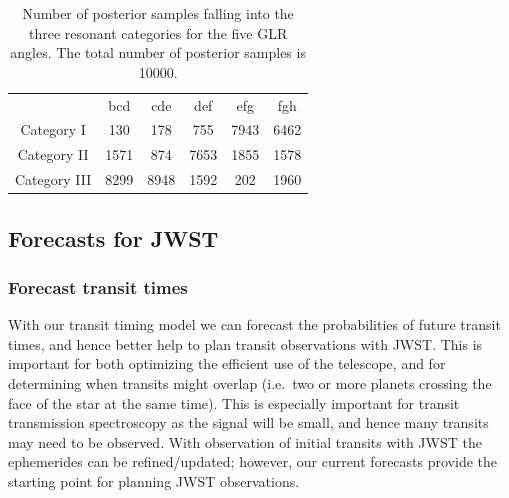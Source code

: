 \documentclass[twocolumn]{aastex63}
\begin{document}
\begin{table}
    \centering
    \begin{tabular}{|c|c c c c c}
                     & bcd  & cde  & def  & efg  & fgh  \\
        Category I   & 130  & 178  & 755  & 7943 & 6462 \\
        Category II  & 1571 & 874  & 7653 & 1855 & 1578 \\
        Category III & 8299 & 8948 & 1592 & 202  & 1960
    \end{tabular}
    \caption{Number of posterior samples falling into the three resonant categories for the five GLR angles. The total number of posterior samples is 10000.}
    \label{tab:cat}
\end{table}




\subsection{Forecasts for JWST}

%


\subsubsection{Forecast transit times}

With our transit timing model we can forecast the probabilities of future transit times,
and hence better help to plan transit observations with JWST.  This is
important for both optimizing the efficient use of the telescope, and for
determining when transits might overlap (i.e.\ two or more planets crossing the face
of the star at the same time).  This is especially important for transit
transmission spectroscopy as the signal will be small, and hence many
transits may need to be observed.  With observation of initial transits
with JWST the ephemerides can be refined/updated;  however, our current
forecasts provide the starting point for planning JWST observations.
\end{document}

